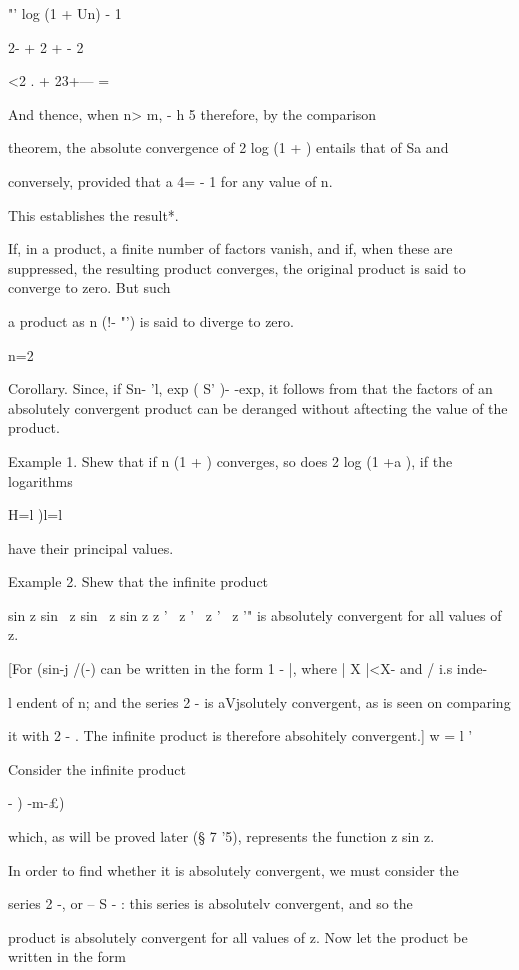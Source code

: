   "' log (1 + Un) - 1

2- + 2 +    - 2

<2 . + 23+--- =

And thence, when n> m, - h 5 therefore, by the comparison

theorem, the absolute convergence of 2 log (1 + ) entails that of Sa
and

conversely, provided that a 4= - 1 for any value of n.

This establishes the result*.

If, in a product, a finite number of factors vanish, and if, when
these are suppressed, the resulting product converges, the original
product is said to converge to zero. But such

a product as n (!- "') is said to diverge to zero.

n=2

Corollary. Since, if Sn- 'l, exp ( S' )- -exp, it follows from 
that the factors of an absolutely convergent product can be deranged
without aftecting the value of the product.

Example 1. Shew that if n (1 + ) converges, so does 2 log (1 +a ), if
the logarithms

H=l )l=l

have their principal values.

Example 2. Shew that the infinite product

sin z sin \ z sin \ z sin z z ' \ z ' \ z ' \ z '" is absolutely
convergent for all values of z.

[For (sin-j /(-) can be written in the form 1 - |, where | X |<X- and
/ i.s inde-

l endent of n; and the series 2 - is aVjsolutely convergent, as is
seen on comparing

it with 2 - . The infinite product is therefore absohitely
convergent.] w = l '

Consider the infinite
product

  - ) -m-£)

which, as will be proved later (§ 7 '5), represents the function z sin
z.

In order to find whether it is absolutely convergent, we must consider
the

series 2 -, or -- S - : this series is absolutelv convergent, and so
the

product is absolutely convergent for all values of z. Now let the
product be written in the form


